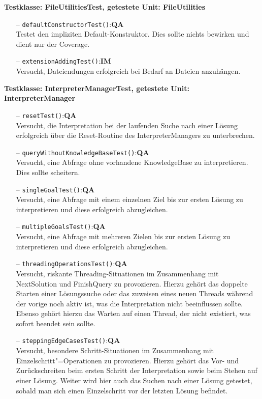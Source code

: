 \documentclass[parskip=full,11pt,twoside]{scrartcl}
\def\qa{\hfill\textbf{QA}}
\def\impl{\hfill\textbf{IM}}
\begin{document}
\textbf{Testklasse: FileUtilitiesTest, getestete Unit: FileUtilities}
\begin{itemize}
	\item[--] \texttt{defaultConstructorTest()}:\qa\\
	Testet den impliziten Default-Konstruktor. Dies sollte nichts bewirken und dient nur der Coverage.
	\item[--] \texttt{extensionAddingTest()}:\impl\\
	Versucht, Dateiendungen erfolgreich bei Bedarf an Dateien anzuhängen.
\end{itemize}

\textbf{Testklasse: InterpreterManagerTest, getestete Unit: InterpreterManager}
\begin{itemize}
	\item[--] \texttt{resetTest()}:\qa\\
	Versucht, die Interpretation bei der laufenden Suche nach einer Lösung erfolgreich über die Reset-Routine des InterpreterManagers zu unterbrechen.
	\item[--] \texttt{queryWithoutKnowledgeBaseTest()}:\qa\\
	Versucht, eine Abfrage ohne vorhandene KnowledgeBase zu interpretieren. Dies sollte scheitern.
	\item[--] \texttt{singleGoalTest()}:\qa\\
	Versucht, eine Abfrage mit einem einzelnen Ziel bis zur ersten Lösung zu interpretieren und diese erfolgreich abzugleichen.
	\item[--] \texttt{multipleGoalsTest()}:\qa\\
	Versucht, eine Abfrage mit mehreren Zielen bis zur ersten Lösung zu interpretieren und diese erfolgreich abzugleichen.
	\item[--] \texttt{threadingOperationsTest()}:\qa\\
	Versucht, riskante Threading-Situationen im Zusammenhang mit NextSolution und FinishQuery zu provozieren. Hierzu gehört das doppelte Starten einer Lösungssuche oder das zuweisen eines neuen Threads während der vorige noch aktiv ist, was die Interpretation nicht beeinflussen sollte. Ebenso gehört hierzu das Warten auf einen Thread, der nicht existiert, was sofort beendet sein sollte.
	\item[--] \texttt{steppingEdgeCasesTest()}:\qa\\
	Versucht, besondere Schritt-Situationen im Zusammenhang mit Einzelschritt"=Operationen zu provozieren. Hierzu gehört das Vor- und Zurückschreiten beim ersten Schritt der Interpretation sowie beim Stehen auf einer Lösung. Weiter wird hier auch das Suchen nach einer Lösung getestet, sobald man sich einen Einzelschritt vor der letzten Lösung befindet.
\end{itemize}
\end{document}
